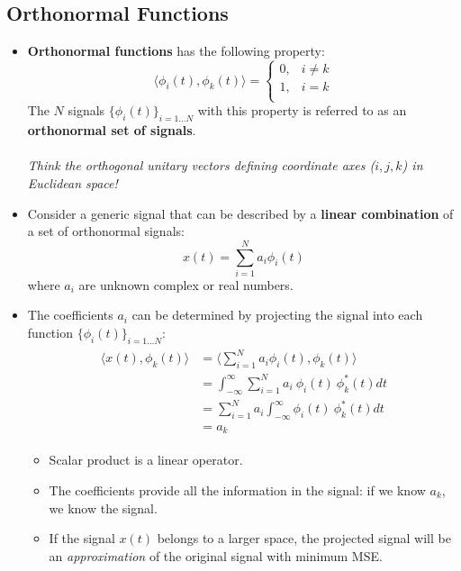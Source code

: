 \documentclass[12pt,a4paper]{article}
\begin{document}
\subsection{Orthonormal Functions}
\begin{itemize}
\item \textbf{Orthonormal functions} has the following property:
\[ \langle \phi_{i}(t), \phi_{k}(t) \rangle = \begin{cases}
0, & i \neq k\\
1, & i = k\\
\end{cases} \]
The $N$ signals $\{ \phi_{i}(t)\}_{i=1...N}$ with this property is referred to as an \textbf{orthonormal set of signals}.\\\\
\textit{Think the orthogonal unitary vectors defining coordinate axes ($i,j,k$) in Euclidean space!}

\item Consider a generic signal that can be described by a \textbf{linear combination} of a set of orthonormal signals:
\[ x(t) = \sum_{i=1}^{N} a_{i} \phi_{i}(t) \]
where $a_{i}$ are unknown complex or real numbers. %
\item The coefficients $a_{i}$ can be determined by projecting the signal into each function $\{ \phi_{i}(t)\}_{i=1...N} $:
\begin{align*}\begin{split}
\langle x(t), \phi_{k}(t) \rangle  &= \langle \sum_{i=1}^{N} a_{i} \phi_{i}(t), \phi_{k}(t) \rangle \\
&= \int_{-\infty}^{\infty} \sum_{i=1}^{N} a_{i} \ \phi_{i}(t) \ \phi_{k}^{*}(t) dt\\
&=\sum_{i=1}^{N} a_{i} \int_{-\infty}^{\infty}\phi_{i}(t) \ \phi_{k}^{*}(t) dt \\
&=a_{k}
\end{split} \end{align*}
 \begin{itemize}
 \item Scalar product is a linear operator.
 \item The coefficients provide all the information in the signal: if we know $a_{k}$, we know the signal.
 \item If the signal $x(t)$ belongs to a larger space, the projected signal will be an \textit{approximation} of the original signal with minimum MSE.
 \end{itemize} \end{itemize}
\end{document}
